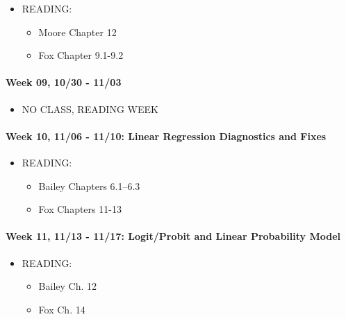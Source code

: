\documentclass[11pt,]{article}
\providecommand{\tightlist}{%
  \setlength{\itemsep}{0pt}\setlength{\parskip}{0pt}}
\begin{document}
\begin{itemize}
\tightlist
\item
  READING:

  \begin{itemize}
  \tightlist
  \item
    Moore Chapter 12
  \item
    Fox Chapter 9.1-9.2
  \end{itemize}
\end{itemize}

\paragraph{Week 09, 10/30 - 11/03}\label{week-09-1030---1103}

\begin{itemize}
\tightlist
\item
  NO CLASS, READING WEEK
\end{itemize}

\paragraph{Week 10, 11/06 - 11/10: Linear Regression Diagnostics and
Fixes}\label{week-10-1106---1110-linear-regression-diagnostics-and-fixes}

\begin{itemize}
\tightlist
\item
  READING:

  \begin{itemize}
  \tightlist
  \item
    Bailey Chapters 6.1--6.3
  \item
    Fox Chapters 11-13
  \end{itemize}
\end{itemize}

\paragraph{Week 11, 11/13 - 11/17: Logit/Probit and Linear Probability
Model}\label{week-11-1113---1117-logitprobit-and-linear-probability-model}

\begin{itemize}
\tightlist
\item
  READING:

  \begin{itemize}
  \tightlist
  \item
    Bailey Ch. 12
  \item
    Fox Ch. 14
  \end{itemize}
\end{itemize}
\end{document}

